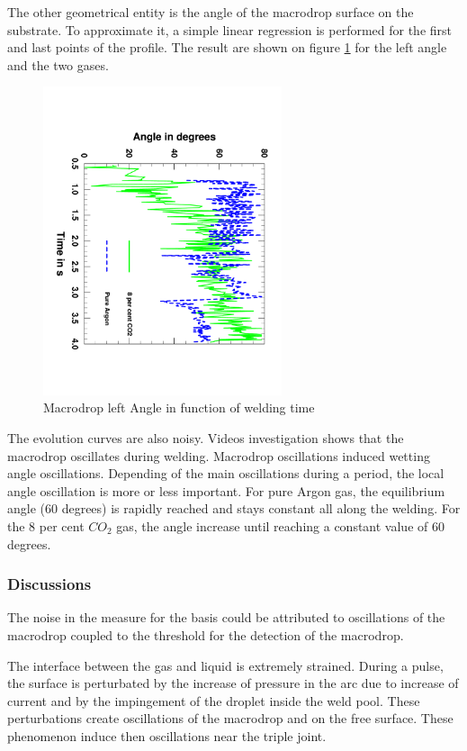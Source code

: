 \documentclass[12pt]{iopart}
\begin{document}
The other geometrical entity is the angle of the macrodrop surface on the substrate.
 To approximate it, a simple linear regression is
performed for the first and last points of the profile. The result are shown on figure \ref{fig::angles}
for the left angle and the two gases.

\begin{figure}[h!]
\centering    
\includegraphics[width=7cm,angle=90]{images/Evolution_Angle_Gazs.pdf}
\caption{Macrodrop left Angle in function of welding time}
\label{fig::angles}
\end{figure}

The evolution curves are also noisy. Videos investigation shows that the macrodrop oscillates during welding. 
Macrodrop oscillations induced  wetting angle oscillations. Depending of the main oscillations during
a period, the local angle oscillation is more or less important. For pure Argon
gas, the equilibrium angle (60 degrees) is rapidly reached and stays constant all along the welding.
For the 8 per cent $CO_2$ gas, the angle increase until reaching a constant value of 60 degrees.


\subsubsection{Discussions}
\label{discussion}

The noise in the measure for the basis could be attributed
to oscillations of the macrodrop coupled to the threshold for the detection of the macrodrop.

The interface between the gas and liquid is extremely strained. During a pulse, the surface is perturbated by the
increase of pressure in the arc due to increase of current and by the impingement of the droplet inside the
weld pool. These perturbations create oscillations of the macrodrop and on the free surface.
 These phenomenon induce then oscillations near the triple joint.
\end{document}
